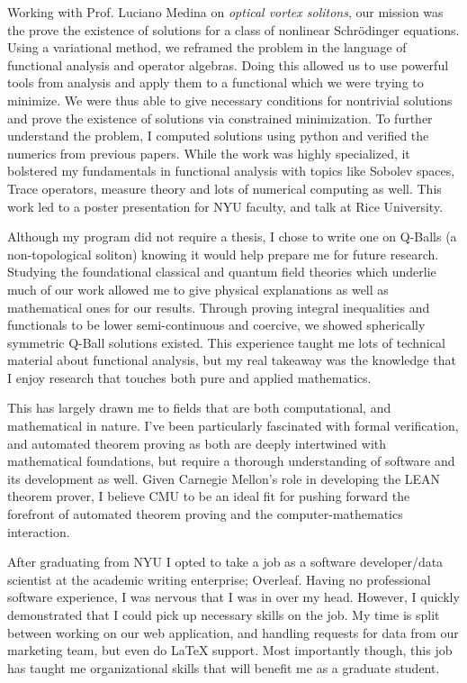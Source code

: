 \documentclass[11pt]{article}
\begin{document}
Working with Prof. Luciano Medina on \textit{optical vortex solitons}, our mission was the prove the existence of solutions for a class of nonlinear Schr\"{o}dinger equations. Using a variational method, we reframed the problem in the language of functional analysis and operator algebras. Doing this allowed us to use powerful tools from analysis and apply them to a functional which we were trying to minimize. We were thus able to give necessary conditions for nontrivial solutions and prove the existence of solutions via constrained minimization. To further understand the problem, I computed solutions using python and verified the numerics from previous papers. While the work was highly specialized, it bolstered my fundamentals in functional analysis with topics like Sobolev spaces, Trace operators, measure theory and lots of numerical computing as well. This work led to a poster presentation for NYU faculty, and talk at Rice University.

Although my program did not require a thesis, I chose to write one on Q-Balls (a non-topological soliton) knowing it would help prepare me for future research. Studying the foundational classical and quantum field theories which underlie much of our work allowed me to give physical explanations as well as mathematical ones for our results. Through proving integral inequalities and functionals to be lower semi-continuous and coercive, we showed spherically symmetric Q-Ball solutions existed. This experience taught me lots of technical material about functional analysis, but my real takeaway was the knowledge that I enjoy research that touches both pure and applied mathematics.

This has largely drawn me to fields that are both computational, and mathematical in nature. I've been particularly fascinated with formal verification, and automated theorem proving as both are deeply intertwined with mathematical foundations, but require a thorough understanding of software and its development as well. Given Carnegie Mellon's role in developing the LEAN theorem prover, I believe CMU to be an ideal fit for pushing forward the forefront of automated theorem proving and the computer-mathematics interaction.

After graduating from NYU I opted to take a job as a software developer/data scientist at the academic writing enterprise; Overleaf. Having no professional software experience, I was nervous that I was in over my head. However, I quickly demonstrated that I could pick up necessary skills on the job. My time is split between working on our web application, and handling requests for data from our marketing team, but even do \LaTeX{} support. Most importantly though, this job has taught me organizational skills that will benefit me as a graduate student. 
\end{document}
